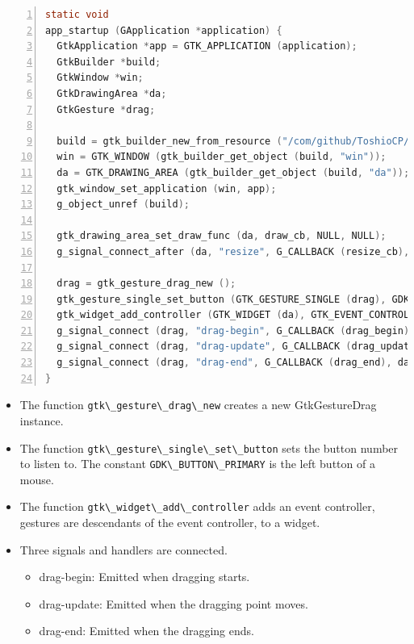 \begin{lstlisting}[language=C, numbers=left]
static void
app_startup (GApplication *application) {
  GtkApplication *app = GTK_APPLICATION (application);
  GtkBuilder *build;
  GtkWindow *win;
  GtkDrawingArea *da;
  GtkGesture *drag;

  build = gtk_builder_new_from_resource ("/com/github/ToshioCP/rect/rect.ui");
  win = GTK_WINDOW (gtk_builder_get_object (build, "win"));
  da = GTK_DRAWING_AREA (gtk_builder_get_object (build, "da"));
  gtk_window_set_application (win, app);
  g_object_unref (build);

  gtk_drawing_area_set_draw_func (da, draw_cb, NULL, NULL);
  g_signal_connect_after (da, "resize", G_CALLBACK (resize_cb), NULL);

  drag = gtk_gesture_drag_new ();
  gtk_gesture_single_set_button (GTK_GESTURE_SINGLE (drag), GDK_BUTTON_PRIMARY);
  gtk_widget_add_controller (GTK_WIDGET (da), GTK_EVENT_CONTROLLER (drag));
  g_signal_connect (drag, "drag-begin", G_CALLBACK (drag_begin), NULL);
  g_signal_connect (drag, "drag-update", G_CALLBACK (drag_update), da);
  g_signal_connect (drag, "drag-end", G_CALLBACK (drag_end), da);
}
\end{lstlisting}

\begin{itemize}
\tightlist
\item
  The function \passthrough{\lstinline!gtk\_gesture\_drag\_new!} creates
  a new GtkGestureDrag instance.
\item
  The function
  \passthrough{\lstinline!gtk\_gesture\_single\_set\_button!} sets the
  button number to listen to. The constant
  \passthrough{\lstinline!GDK\_BUTTON\_PRIMARY!} is the left button of a
  mouse.
\item
  The function \passthrough{\lstinline!gtk\_widget\_add\_controller!}
  adds an event controller, gestures are descendants of the event
  controller, to a widget.
\item
  Three signals and handlers are connected.

  \begin{itemize}
  \tightlist
  \item
    drag-begin: Emitted when dragging starts.
  \item
    drag-update: Emitted when the dragging point moves.
  \item
    drag-end: Emitted when the dragging ends.
  \end{itemize}
\end{itemize}

